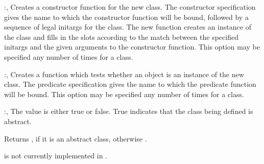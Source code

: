 \begin{optDefinition}
\begin{options}
    \item[\keyworddef{constructor}:, \scref{constructor-specification}]%
    Creates a constructor function for the new class.  The constructor
    specification gives the name to which the constructor function will be
    bound, followed by a sequence of legal initargs for the class.  The new
    function creates an instance of the class and fills in the slots according
    to the match between the specified initargs and the given arguments to the
    constructor function.  This option may be specified any number of times for
    a class.

    \item[\keyworddef{predicate}:, \scref{identifier}]%
    Creates a function which tests whether an object is an instance of the new
    class.  The predicate specification gives the name to which the predicate
    function will be bound.  This option may be specified any number of times
    for a class.

    \item[\keyworddef{abstractp}:, \scref{boolean}]%
    The value is either true or false. True indicates that the class being
    defined is abstract.
%
\end{options}
%
\end{optDefinition}
%
%
\Signature
{}
%
%
\begin{arguments}
    \item[\sc{object}] Returns , if it is an abstract class,
    otherwise \nil{}.
\end{arguments}
%
\begin{note}
     is not currently implemented in \youtoo.
\end{note}
%
